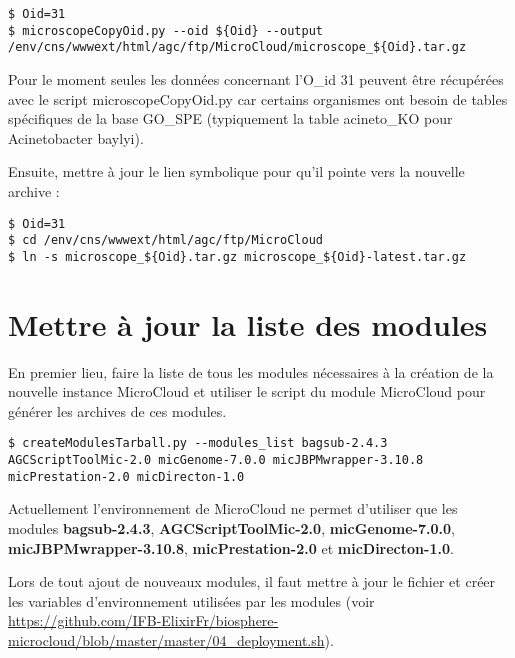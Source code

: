 \begin{lstlisting}[style=bash]
$ Oid=31
$ microscopeCopyOid.py --oid ${Oid} --output /env/cns/wwwext/html/agc/ftp/MicroCloud/microscope_${Oid}.tar.gz
\end{lstlisting}

\begin{mycolorbox}
	Pour le moment seules les données concernant l'O\_id 31 peuvent être récupérées avec le script microscopeCopyOid.py car certains organismes ont besoin de tables spécifiques de la base GO\_SPE (typiquement la table acineto\_KO pour Acinetobacter baylyi).
\end{mycolorbox}

Ensuite, mettre à jour le lien symbolique pour qu'il pointe vers la nouvelle archive :
\begin{lstlisting}[style=bash]
$ Oid=31
$ cd /env/cns/wwwext/html/agc/ftp/MicroCloud
$ ln -s microscope_${Oid}.tar.gz microscope_${Oid}-latest.tar.gz
\end{lstlisting}

\section{Mettre à jour la liste des modules}

En premier lieu, faire la liste de tous les modules nécessaires à la création de la nouvelle instance MicroCloud et utiliser le script  du module MicroCloud pour générer les archives de ces modules.

\begin{lstlisting}[style=bash]
$ createModulesTarball.py --modules_list bagsub-2.4.3 AGCScriptToolMic-2.0 micGenome-7.0.0 micJBPMwrapper-3.10.8 micPrestation-2.0 micDirecton-1.0
\end{lstlisting}

Actuellement l'environnement de MicroCloud ne permet d'utiliser que les modules \textbf{bagsub-2.4.3}, \textbf{AGCScriptToolMic-2.0}, \textbf{micGenome-7.0.0}, \textbf{micJBPMwrapper-3.10.8}, \textbf{micPrestation-2.0} et \textbf{micDirecton-1.0}.
\newline

\begin{mycolorbox}
	Lors de tout ajout de nouveaux modules, il faut mettre à jour le fichier  et créer les variables d'environnement utilisées par les modules (voir \url{https://github.com/IFB-ElixirFr/biosphere-microcloud/blob/master/master/04_deployment.sh}).
\end{mycolorbox}

